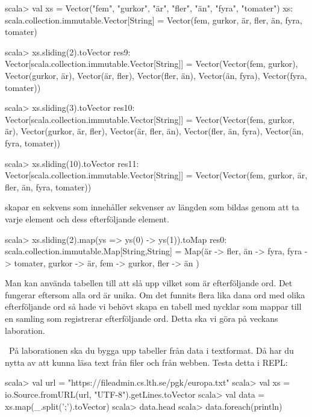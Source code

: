 \SubtaskSolved
\begin{REPL}
scala> val xs = Vector("fem", "gurkor", "är", "fler", "än", "fyra", "tomater")
xs: scala.collection.immutable.Vector[String] =
Vector(fem, gurkor, är, fler, än, fyra, tomater)

scala> xs.sliding(2).toVector
res9: Vector[scala.collection.immutable.Vector[String]] =
Vector(Vector(fem, gurkor), Vector(gurkor, är), Vector(är, fler), Vector(fler, än), Vector(än, fyra), Vector(fyra, tomater))

scala> xs.sliding(3).toVector
res10: Vector[scala.collection.immutable.Vector[String]] =
Vector(Vector(fem, gurkor, är), Vector(gurkor, är, fler), Vector(är, fler, än), Vector(fler, än, fyra), Vector(än, fyra, tomater))

scala> xs.sliding(10).toVector
res11: Vector[scala.collection.immutable.Vector[String]] =
Vector(Vector(fem, gurkor, är, fler, än, fyra, tomater))

\end{REPL}
 skapar en sekvens som innehåller sekvenser av längden  som bildas genom att ta varje element och dess  efterföljande element.

\SubtaskSolved
\begin{REPL}
scala> xs.sliding(2).map(ys => ys(0) -> ys(1)).toMap
res0: scala.collection.immutable.Map[String,String] =
Map(är -> fler,
    än -> fyra,
    fyra -> tomater,
    gurkor -> är,
    fem -> gurkor,
    fler -> än
)
\end{REPL}
Man kan använda tabellen till att slå upp vilket som är efterföljande ord. Det fungerar eftersom alla ord är unika. Om det funnits flera lika dana ord med olika efterföljande ord så hade vi behövt skapa en tabell med nycklar som mappar till en samling som registrerar efterföljande ord. Detta ska vi göra på veckans laboration.

\QUESTEND





\QUESTBEGIN

\Task \what~På laborationen ska du bygga upp tabeller från data i textformat. Då har du nytta av att kunna läsa text från filer och från webben. Testa detta i REPL:
\begin{REPL}
scala> val url = "https://fileadmin.cs.lth.se/pgk/europa.txt"
scala> val xs = io.Source.fromURL(url, "UTF-8").getLines.toVector
scala> val data = xs.map(_.split(';').toVector)
scala> data.head
scala> data.foreach(println)
\end{REPL}

